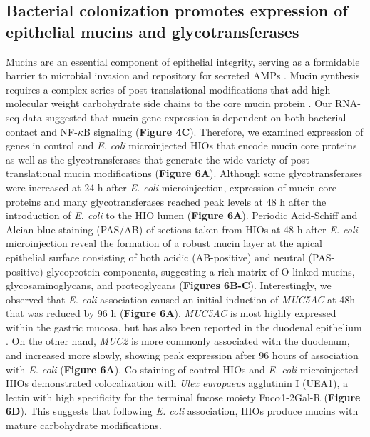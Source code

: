 \documentclass[9pt,lineo]{elife}
\begin{document}
\subsection*{{\bfseries\sffamily } Bacterial colonization promotes expression of epithelial mucins and glycotransferases}
\label{sec:orgheadline8}
Mucins are an essential component of epithelial integrity, serving as a formidable barrier to microbial invasion and repository for secreted AMPs \citep{Bergstrom:2013,Cornick:2015,Johansson:2016,Kim:2010}. Mucin synthesis requires a complex series of post-translational modifications that add high molecular weight carbohydrate side chains to the core mucin protein \citep{varki2017essentials}. Our RNA-seq data suggested that mucin gene expression is dependent on both bacterial contact and NF-\(\kappa\)B signaling (\textbf{Figure 4C}). Therefore, we examined expression of genes in control and \emph{E. coli} microinjected HIOs that encode mucin core proteins as well as the glycotransferases that generate the wide variety of post-translational mucin modifications (\textbf{Figure 6A}). Although some glycotransferases were increased at 24 h after \emph{E. coli} microinjection, expression of mucin core proteins and many glycotransferases reached peak levels at 48 h after the introduction of \emph{E. coli} to the HIO lumen (\textbf{Figure 6A}). Periodic Acid-Schiff and Alcian blue staining (PAS/AB) of sections taken from HIOs at 48 h after \emph{E. coli} microinjection reveal the formation of a robust mucin layer at the apical epithelial surface consisting of both acidic (AB-positive) and neutral (PAS-positive) glycoprotein components, suggesting a rich matrix of O-linked mucins, glycosaminoglycans, and proteoglycans (\textbf{Figures 6B-C}). Interestingly, we observed that \emph{E. coli} association caused an initial induction of \emph{MUC5AC} at 48h that was reduced by 96 h (\textbf{Figure 6A}). \emph{MUC5AC} is most highly expressed within the gastric mucosa, but has also been reported in the duodenal epithelium \citep{Buisine:1998,Buisine:2001,Rodriguez-Pineiro:2013}. On the other hand, \emph{MUC2} is more commonly associated with the duodenum, and increased more slowly, showing peak expression after 96 hours of association with \emph{E. coli} (\textbf{Figure 6A}). Co-staining of control HIOs and \emph{E. coli} microinjected HIOs demonstrated colocalization with \emph{Ulex europaeus} agglutinin I (UEA1), a lectin with high specificity for the terminal fucose moiety Fuc\(\alpha\)1-2Gal-R (\textbf{Figure 6D}). This suggests that following \emph{E. coli} association, HIOs produce mucins with mature carbohydrate modifications.
\end{document}

